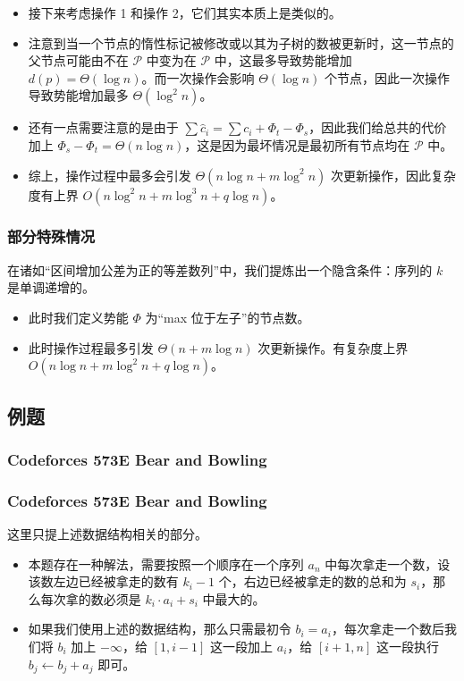 \documentclass[mathserif]{ctexbeamer}
\begin{document}
\frame
{
  \begin{itemize}
  
  \item<1->接下来考虑操作 1 和操作 2，它们其实本质上是类似的。
  
  \item<2->注意到当一个节点的惰性标记被修改或以其为子树的数被更新时，这一节点的父节点可能由不在 $\mathcal P$ 中变为在 $\mathcal P$ 中，这最多导致势能增加 $d(p) = \Theta(\log n)$。而一次操作会影响 $\Theta(\log n)$ 个节点，因此一次操作导致势能增加最多 $\Theta(\log^2 n)$。

  \item<3->还有一点需要注意的是由于 $\sum \widehat c_i = \sum c_i + \Phi_t - \Phi_s$，因此我们给总共的代价加上 $\Phi_s - \Phi_t = \Theta(n\log n)$，这是因为最坏情况是最初所有节点均在 $\mathcal P$ 中。

  \item<4->综上，操作过程中最多会引发 $\Theta(n\log n + m\log^2 n)$ 次更新操作，因此复杂度有上界 $O(n\log^2 n + m\log^3 n + q\log n)$。
  \end{itemize}
}

\frame
{
  \frametitle{部分特殊情况}
  
  在诸如“区间增加公差为正的等差数列”中，我们提炼出一个隐含条件：序列的 $k$ 是单调递增的。
  
  \begin{itemize}
  \item<1-> 此时我们定义势能 $\Phi$ 为“max 位于左子”的节点数。
  \item<2-> 此时操作过程最多引发 $\Theta(n + m\log n)$ 次更新操作。有复杂度上界 $O(n\log n + m\log^2 n + q\log n)$。
  \end{itemize}
}

\subsection{例题}

\subsubsection{Codeforces 573E Bear and Bowling}
\frame
{
  \frametitle{Codeforces 573E Bear and Bowling}
  
  这里只提上述数据结构相关的部分。
  
  \begin{itemize}
  \item<1->本题存在一种解法，需要按照一个顺序在一个序列 $a_n$ 中每次拿走一个数，设该数左边已经被拿走的数有 $k_i - 1$ 个，右边已经被拿走的数的总和为 $s_i$，那么每次拿的数必须是 $k_i\cdot a_i + s_i$ 中最大的。\cite{xyx}

  \item<2->如果我们使用上述的数据结构，那么只需最初令 $b_i = a_i$，每次拿走一个数后我们将 $b_i$ 加上 $-\infty$，给 $[1, i - 1]$ 这一段加上 $a_i$，给 $[i + 1, n]$ 这一段执行 $b_j \leftarrow b_j + a_j$ 即可。
  \end{itemize}
}
\end{document}
